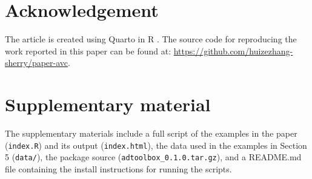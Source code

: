 \documentclass[
  12pt,
]{interact}
\begin{document}
\section{Acknowledgement}\label{acknowledgement}

The article is created using Quarto \citep{Allaire_Quarto_2022} in R
\citep{R}. The source code for reproducing the work reported in this
paper can be found at:
\url{https://github.com/huizezhang-sherry/paper-avc}.

\section*{Supplementary material}\label{supplementary-material}

The supplementary materials include a full script of the examples in the
paper (\texttt{index.R}) and its output (\texttt{index.html}), the data
used in the examples in Section 5 (\texttt{data/}), the package source
(\texttt{adtoolbox\_0.1.0.tar.gz}), and a README.md file containing the
install instructions for running the scripts.


\renewcommand\refname{References}

\end{document}
